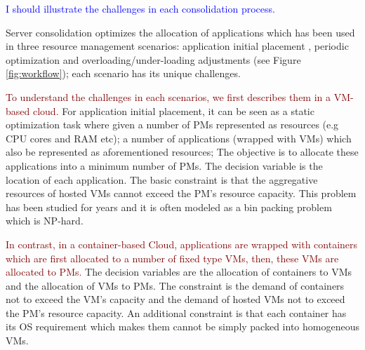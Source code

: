 \textcolor{blue}{I should illustrate the challenges in each consolidation process.}

Server consolidation optimizes the allocation of applications which has been used in three resource management scenarios: application initial placement  \cite{Jennings:2015ht}, periodic optimization \cite{Mishra:2012kx} and overloading/under-loading adjustments \cite{Mishra:2012kx} (see Figure \ref{fig:workflow}); each scenario has its unique challenges.



\textcolor{Maroon}{To understand the challenges in each scenarios, we first describes them in a VM-based cloud.} For application initial placement, it can be seen as a static optimization task where given a number of  PMs represented as resources (e.g CPU cores and RAM etc);  a number of applications (wrapped with VMs) which also be represented as aforementioned resources; The objective is to allocate these applications into a minimum number of PMs. The decision variable is the location of each application. The basic constraint is that the aggregative resources of hosted VMs cannot exceed the PM's resource capacity.  This problem has been studied for years \cite{Xu:2010vh, Gao:2013gg, Ferdaus:2014ep} and it is often modeled as a bin packing problem \cite{Xiong:2014jq} which is NP-hard. 

\textcolor{Maroon}{In contrast, in a container-based Cloud, applications are wrapped with containers which are first allocated to a number of fixed type VMs, then, these VMs are allocated to PMs.} The decision variables are the allocation of containers to VMs and the allocation of VMs to PMs. The constraint is the demand of containers not to exceed the VM's capacity and the demand of hosted VMs not to exceed the PM's resource capacity. An additional constraint is that each container has its OS requirement which makes them cannot be simply packed into homogeneous VMs.

